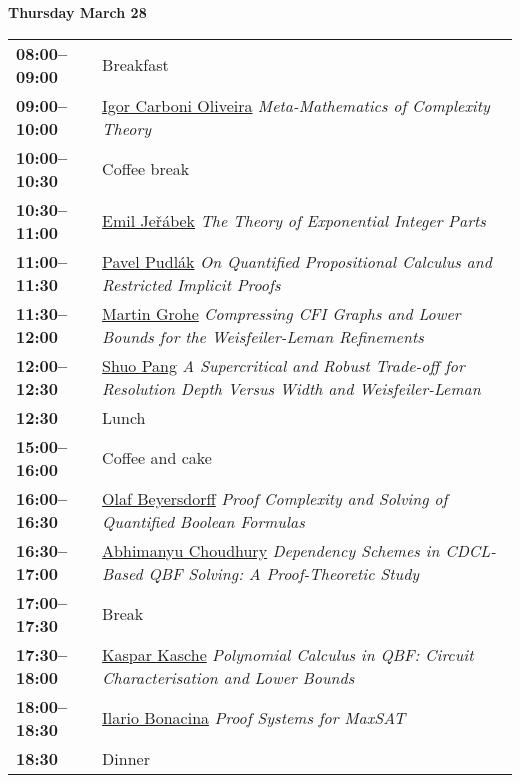 \documentclass[11pt]{article}
\newcommand{\scheduletablewidth}{5.06in}
\begin{document}
\noindent\begin{minipage}{\textwidth}
\begin{center} {\bf\large Thursday March 28} \end{center}
\begin{tabular}{ p{0.9in} p{\scheduletablewidth} }

{\bf 08:00--09:00}  & Breakfast\\

{\bf 09:00--10:00} & \hyperref[Oliveira]{Igor Carboni Oliveira}
{\em Meta-Mathematics of Complexity Theory} \\

{\bf 10:00--10:30} & {Coffee break} \\

{\bf 10:30--11:00} & \hyperref[Jerabek]{Emil Je\v{r}\'{a}bek}
{\em The Theory of Exponential Integer Parts} \\

{\bf 11:00--11:30} & \hyperref[Pudlak]{Pavel Pudl\'{a}k}
{\em On Quantified Propositional Calculus and Restricted Implicit Proofs} \\

{\bf 11:30--12:00} & \hyperref[Grohe]{Martin Grohe}
{\em Compressing CFI Graphs and Lower Bounds for the Weisfeiler-Leman Refinements} \\

{\bf 12:00--12:30} & \hyperref[Pang]{Shuo Pang}
{\em A Supercritical and Robust Trade-off for Resolution Depth Versus Width and Weisfeiler-Leman} \\



{\bf 12:30%
} &  Lunch\\

{\bf 15:00--16:00} &  Coffee and cake \\

{\bf 16:00--16:30} & \hyperref[Beyersdorff]{Olaf Beyersdorff}
{\em Proof Complexity and Solving of Quantified Boolean Formulas} \\

{\bf 16:30--17:00} & \hyperref[Choudhury]{Abhimanyu Choudhury}
{\em Dependency Schemes in CDCL-Based QBF Solving: A Proof-Theoretic Study} \\

{\bf 17:00--17:30} & {Break} \\

{\bf 17:30--18:00} & \hyperref[Kasche]{Kaspar Kasche}
{\em Polynomial Calculus in QBF: Circuit Characterisation and Lower Bounds} \\

{\bf 18:00--18:30} & \hyperref[Bonacina]{Ilario Bonacina}
{\em Proof Systems for MaxSAT} \\

{\bf 18:30%
} & Dinner \\
\end{tabular}
\end{minipage}
\end{document}
